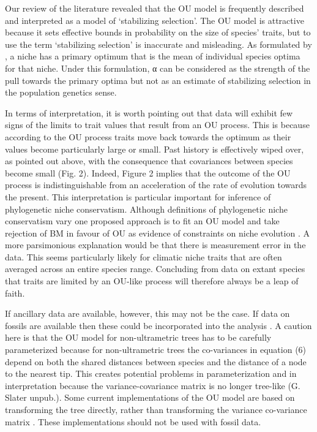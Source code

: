 \documentclass[a4paper,12pt]{article}
\begin{document}
Our review of the literature revealed that the OU model is frequently described and interpreted as a model of ‘stabilizing selection’. The OU model is attractive because it sets effective bounds in probability on the size of species’ traits, but to use the term ‘stabilizing selection’ is inaccurate and misleading. As formulated by \citet{hansen1997stabilizing}, a niche has a primary optimum that is the mean of individual species optima for that niche. Under this formulation, α can be considered as the strength of the pull towards the primary optima \citep{hansen2012adaptive} but not as an estimate of stabilizing selection in the population genetics sense. 

In terms of interpretation, it is worth pointing out that data will exhibit few signs of the limits to trait values that result from an OU process. This is because according to the OU process traits move back towards the optimum as their values become particularly large or small. Past history is effectively wiped over, as pointed out above, with the consequence that covariances between species become small (Fig. 2). Indeed, Figure 2 implies that the outcome of the OU process is indistinguishable from an acceleration of the rate of evolution towards the present. This interpretation is particular important for inference of phylogenetic niche conservatism. Although definitions of phylogenetic niche conservatism vary \citep{Losos:2008aa,Losos:2008ab,Wiens:2008aa,crisp2012phylogenetic} one proposed approach is to fit an OU model and take rejection of BM in favour of OU as evidence of constraints on niche evolution \citep{Wiens:2010aa}. A more parsimonious explanation would be that there is measurement error in the data. This seems particularly likely for climatic niche traits that are often averaged across an entire species range. Concluding from data on extant species that traits are limited by an OU-like process will therefore always be a leap of faith. 

If ancillary data are available, however, this may not be the case. If data on fossils are available then these could be incorporated into the analysis \citep{Slater:2012ab}.  A caution here is that the OU model for non-ultrametric trees has to be carefully parameterized because for non-ultrametric trees the co-variances in equation (6) depend on both the shared distances between species and the distance of a node to the nearest tip. This creates potential problems in parameterization and in interpretation because the variance-covariance matrix is no longer tree-like (G. Slater unpub.). Some current implementations of the OU model are based on transforming the tree directly, rather than transforming the variance co-variance matrix \citep[e.g., MOTMOT;][]{Thomas:2011aa}. These implementations should not be used with fossil data.
\end{document}
